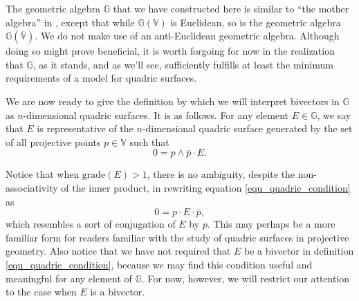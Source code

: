 \documentclass{birkjour}
\theoremstyle{definition}
\theoremstyle{remark}
\numberwithin{equation}{section}
\newcommand{\G}{\mathbb{G}}
\newcommand{\V}{\mathbb{V}}
\begin{document}
The geometric algebra $\G$ that we have constructed here is similar to ``the mother algebra''
in \cite{DoranHestenes93}, except that while $\G(\V)$
is Euclidean, so is the geometric algebra $\G(\overline{\V})$.  We do not
make use of an anti-Euclidean geometric algebra.  Although doing so might prove beneficial,
it is worth forgoing for now in the realization that $\G$, as it stands, and as we'll see, sufficiently
fulfills at least the minimum requirements of a model for quadric surfaces.

We are now ready to give the definition by which we will interpret bivectors in $\G$
as $n$-dimensional quadric surfaces.  It is as follows.
For any element $E\in\G$, we say that $E$ is representative of the $n$-dimensional
quadric surface generated by the set of all projective points $p\in\V$ such that
\begin{equation}\label{equ_quadric_condition}
0 = p\wedge\overline{p}\cdot E.
\end{equation}

Notice that when $\mbox{grade}(E)>1$, there is no ambiguity, despite the non-associativity
of the inner product, in rewriting equation
\eqref{equ_quadric_condition} as
\begin{equation}
0 = p\cdot E\cdot\overline{p},
\end{equation}
which resembles a sort of conjugation of $E$ by $p$.  This may perhaps be a more
familiar form for readers familiar with the study of quadric surfaces in projective geometry.
Also notice that we have not required that $E$ be a bivector in definition \eqref{equ_quadric_condition},
because we may find this condition useful and meaningful for any element of $\G$.  For now,
however, we will restrict our attention to the case when $E$ is a bivector.
\end{document}
